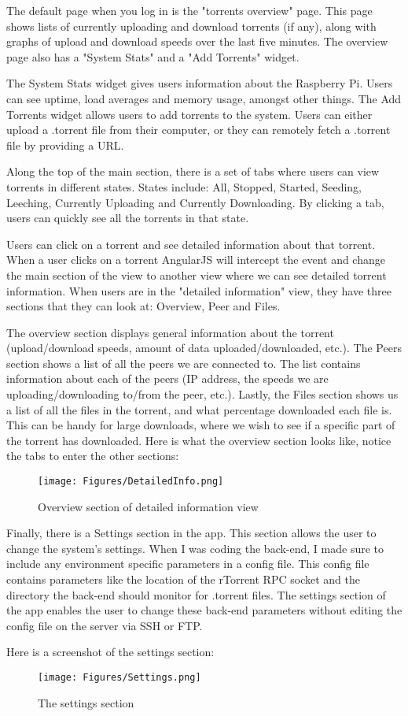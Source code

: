 The default page when you log in is the "torrents overview" page. This page shows lists of currently uploading and download torrents (if any), along with graphs of upload and download speeds over the last five minutes. The overview page also has a "System Stats" and a "Add Torrents" widget.

The System Stats widget gives users information about the Raspberry Pi. Users can see uptime, load averages and memory usage, amongst other things. The Add Torrents widget allows users to add torrents to the system. Users can either upload a .torrent file from their computer, or they can remotely fetch a .torrent file by providing a URL. 

Along the top of the main section, there is a set of tabs where users can view torrents in different states. States include: All, Stopped, Started, Seeding, Leeching, Currently Uploading and Currently Downloading. By clicking a tab, users can quickly see all the torrents in that state.

Users can click on a torrent and see detailed information about that torrent. When a user clicks on a torrent AngularJS will intercept the event and change the main section of the view to another view where we can see detailed torrent information. When users are in the "detailed information" view, they have three sections that they can look at: Overview, Peer and Files. 

The overview section displays general information about the torrent (upload/download speeds, amount of data uploaded/downloaded, etc.). The Peers section shows a list of all the peers we are connected to. The list contains information about each of the peers (IP address, the speeds we are uploading/downloading to/from the peer, etc.). Lastly, the Files section shows us a list of all the files in the torrent, and what percentage downloaded each file is. This can be handy for large downloads, where we wish to see if a specific part of the torrent has downloaded. Here is what the overview section looks like, notice the tabs to enter the other sections:

\vspace{10px}
\begin{figure}[h!]
  \centering
    \texttt{[image: Figures/DetailedInfo.png]}
  \caption{Overview section of detailed information view}
\end{figure}

Finally, there is a Settings section in the app. This section allows the user to change the system's settings. When I was coding the back-end, I made sure to include any environment specific parameters in a config file. This config file contains parameters like the location of the rTorrent RPC socket and the directory the back-end should monitor for .torrent files. The settings section of the app enables the user to change these back-end parameters without editing the config file on the server via SSH or FTP.

Here is a screenshot of the settings section:

\vspace{10px}
\begin{figure}[h!]
  \centering
    \texttt{[image: Figures/Settings.png]}
  \caption{The settings section}
\end{figure}











